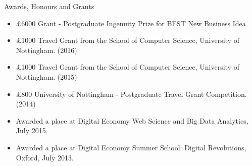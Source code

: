 \documentclass{resume} %
\begin{document}
\begin{rSection}{Awards, Honours and Grants}
\begin{itemize}
   \item \pounds 6000 Grant - Postgraduate Ingenuity Prize for BEST New Business Idea
   \vspace{-1 mm}
   \item \pounds 1000 Travel Grant from the School of Computer Science, University of Nottingham. (2016)
   \vspace{-1 mm}
   \item \pounds 1000 Travel Grant from the School of Computer Science, University of Nottingham. (2015)
   \vspace{-1 mm}
   \item \pounds 800 University of Nottingham - Postgraduate Travel Grant Competition. (2014)
   \vspace{-1 mm}
   \item Awarded a place at Digital Economy Web Science and Big Data Analytics, July 2015.
   \vspace{-1 mm}
   \item Awarded a place at Digital Economy Summer School: Digital Revolutions, Oxford, July 2013.
\end{itemize}
\vspace{-2 mm}


\end{rSection}


\end{document}
